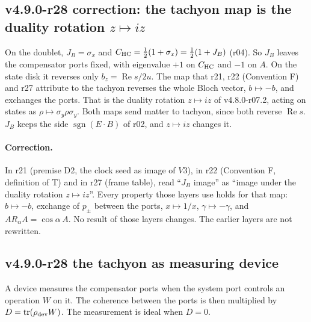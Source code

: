 \subsection*{v4.9.0-r28 correction: the tachyon map is the duality rotation \texorpdfstring{\(z\mapsto iz\)}{z -> iz}}
\label{subsec:v490-r28-correction}

On the doublet, \(J_B=\sigma_x\) and \(C_{\mathrm{HC}}=\tfrac12(1+\sigma_x)=\tfrac12(1+J_B)\) (r04).  So \(J_B\) leaves the compensator ports
fixed, with eigenvalue \(+1\) on \(C_{\mathrm{HC}}\) and \(-1\) on \(A\).  On the state disk it reverses only \(b_z=\operatorname{Re}s/2u\).  The map
that r21, r22 (Convention F) and r27 attribute to the tachyon reverses the whole Bloch vector, \(b\mapsto-b\), and exchanges the
ports.  That is the duality rotation \(z\mapsto iz\) of v4.8.0-r07.2, acting on states as \(\rho\mapsto\sigma_y\rho\sigma_y\).  Both maps
send matter to tachyon, since both reverse \(\operatorname{Re}s\).  \(J_B\) keeps the side \(\operatorname{sgn}(E\cdot B)\) of r02, and
\(z\mapsto iz\) changes it.

\paragraph{Correction.}
In r21 (premise D2, the clock seed as image of \(V3\)), in r22 (Convention F, definition of T) and in r27 (frame table), read
``\(J_B\) image'' as ``image under the duality rotation \(z\mapsto iz\)''.  Every property those layers use holds for that map: \(b\mapsto-b\),
exchange of \(p_\pm\) between the ports, \(x\mapsto1/x\), \(\gamma\mapsto-\gamma\), and \(AR_\alpha A=\cos\alpha\,A\).  No result of those
layers changes.  The earlier layers are not rewritten.

\subsection*{v4.9.0-r28 the tachyon as measuring device}
\label{subsec:v490-r28-tachyon-meter}

A device measures the compensator ports when the system port controls an operation \(W\) on it.  The coherence between the ports
is then multiplied by \(D=\operatorname{tr}(\rho_{\rm dev}W)\).  The measurement is ideal when \(D=0\).

